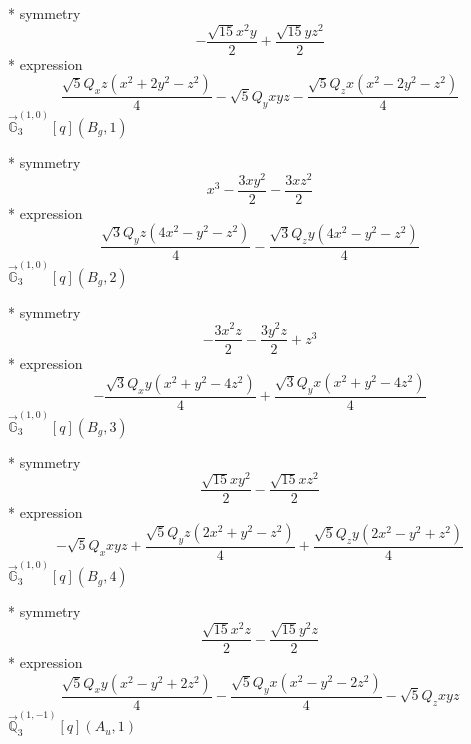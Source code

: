 \documentclass[fleqn,8pt]{jsarticle}
\begin{document}
\noindent\quad ** symmetry
\begin{dmath*}
- \frac{\sqrt{15} x^{2} y}{2} + \frac{\sqrt{15} y z^{2}}{2}
\end{dmath*}
\noindent\quad ** expression
\begin{dmath*}
\frac{\sqrt{5} Q_{x} z \left(x^{2} + 2 y^{2} - z^{2}\right)}{4} - \sqrt{5} Q_{y} x y z - \frac{\sqrt{5} Q_{z} x \left(x^{2} - 2 y^{2} - z^{2}\right)}{4}
\end{dmath*}
\noindent\quad $\vec{\mathbb{G}}_{3}^{(1,0)}[q](B_{g},1)$

\noindent\quad ** symmetry
\begin{dmath*}
x^{3} - \frac{3 x y^{2}}{2} - \frac{3 x z^{2}}{2}
\end{dmath*}
\noindent\quad ** expression
\begin{dmath*}
\frac{\sqrt{3} Q_{y} z \left(4 x^{2} - y^{2} - z^{2}\right)}{4} - \frac{\sqrt{3} Q_{z} y \left(4 x^{2} - y^{2} - z^{2}\right)}{4}
\end{dmath*}
\noindent\quad $\vec{\mathbb{G}}_{3}^{(1,0)}[q](B_{g},2)$

\noindent\quad ** symmetry
\begin{dmath*}
- \frac{3 x^{2} z}{2} - \frac{3 y^{2} z}{2} + z^{3}
\end{dmath*}
\noindent\quad ** expression
\begin{dmath*}
- \frac{\sqrt{3} Q_{x} y \left(x^{2} + y^{2} - 4 z^{2}\right)}{4} + \frac{\sqrt{3} Q_{y} x \left(x^{2} + y^{2} - 4 z^{2}\right)}{4}
\end{dmath*}
\noindent\quad $\vec{\mathbb{G}}_{3}^{(1,0)}[q](B_{g},3)$

\noindent\quad ** symmetry
\begin{dmath*}
\frac{\sqrt{15} x y^{2}}{2} - \frac{\sqrt{15} x z^{2}}{2}
\end{dmath*}
\noindent\quad ** expression
\begin{dmath*}
- \sqrt{5} Q_{x} x y z + \frac{\sqrt{5} Q_{y} z \left(2 x^{2} + y^{2} - z^{2}\right)}{4} + \frac{\sqrt{5} Q_{z} y \left(2 x^{2} - y^{2} + z^{2}\right)}{4}
\end{dmath*}
\noindent\quad $\vec{\mathbb{G}}_{3}^{(1,0)}[q](B_{g},4)$

\noindent\quad ** symmetry
\begin{dmath*}
\frac{\sqrt{15} x^{2} z}{2} - \frac{\sqrt{15} y^{2} z}{2}
\end{dmath*}
\noindent\quad ** expression
\begin{dmath*}
\frac{\sqrt{5} Q_{x} y \left(x^{2} - y^{2} + 2 z^{2}\right)}{4} - \frac{\sqrt{5} Q_{y} x \left(x^{2} - y^{2} - 2 z^{2}\right)}{4} - \sqrt{5} Q_{z} x y z
\end{dmath*}
\noindent\quad $\vec{\mathbb{Q}}_{3}^{(1,-1)}[q](A_{u},1)$
\end{document}
